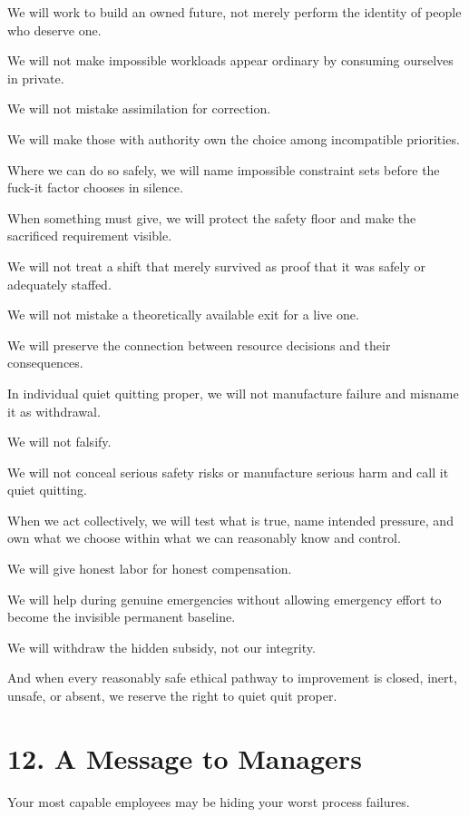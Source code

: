 \documentclass[11pt,oneside]{article}
\begin{document}
We will work to build an owned future, not merely perform the identity
of people who deserve one.

We will not make impossible workloads appear ordinary by consuming
ourselves in private.

We will not mistake assimilation for correction.

We will make those with authority own the choice among incompatible
priorities.

Where we can do so safely, we will name impossible constraint sets
before the fuck-it factor chooses in silence.

When something must give, we will protect the safety floor and make the
sacrificed requirement visible.

We will not treat a shift that merely survived as proof that it was
safely or adequately staffed.

We will not mistake a theoretically available exit for a live one.

We will preserve the connection between resource decisions and their
consequences.

In individual quiet quitting proper, we will not manufacture failure and
misname it as withdrawal.

We will not falsify.

We will not conceal serious safety risks or manufacture serious harm and
call it quiet quitting.

When we act collectively, we will test what is true, name intended
pressure, and own what we choose within what we can reasonably know and
control.

We will give honest labor for honest compensation.

We will help during genuine emergencies without allowing emergency
effort to become the invisible permanent baseline.

We will withdraw the hidden subsidy, not our integrity.

And when every reasonably safe ethical pathway to improvement is closed,
inert, unsafe, or absent, we reserve the right to quiet quit proper.

\hypertarget{a-message-to-managers}{%
\section{12. A Message to Managers}\label{a-message-to-managers}}

Your most capable employees may be hiding your worst process failures.
\end{document}

